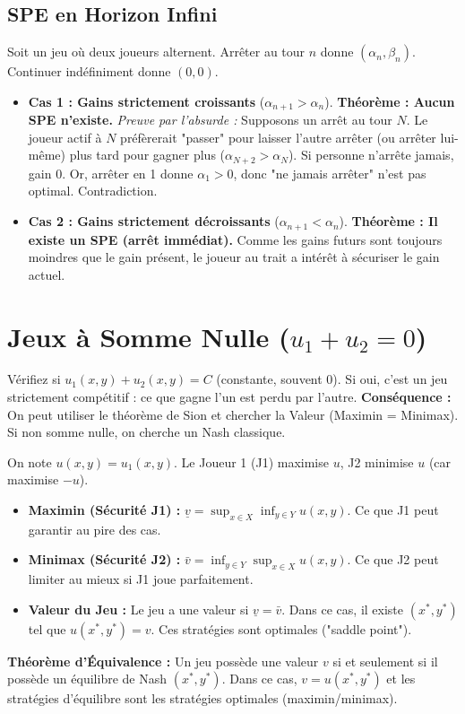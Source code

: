 \documentclass[10pt,a4paper]{article}
\begin{document}
\subsection{SPE en Horizon Infini}
Soit un jeu où deux joueurs alternent. Arrêter au tour $n$ donne $(\alpha_n, \beta_n)$. Continuer indéfiniment donne $(0,0)$.
\begin{itemize}
    \item \textbf{Cas 1 : Gains strictement croissants} ($\alpha_{n+1} > \alpha_n$).
    \textbf{Théorème : Aucun SPE n'existe.}
    \textit{Preuve par l'absurde :}
    Supposons un arrêt au tour $N$. Le joueur actif à $N$ préfèrerait "passer" pour laisser l'autre arrêter (ou arrêter lui-même) plus tard pour gagner plus ($\alpha_{N+2} > \alpha_N$).
    Si personne n'arrête jamais, gain 0. Or, arrêter en 1 donne $\alpha_1 > 0$, donc "ne jamais arrêter" n'est pas optimal. Contradiction.

    \item \textbf{Cas 2 : Gains strictement décroissants} ($\alpha_{n+1} < \alpha_n$).
    \textbf{Théorème : Il existe un SPE (arrêt immédiat).}
    Comme les gains futurs sont toujours moindres que le gain présent, le joueur au trait a intérêt à sécuriser le gain actuel.
\end{itemize}

\section{Jeux à Somme Nulle ($u_1 + u_2 = 0$)}
\begin{tcolorbox}[colback=green!5,title=Astuce : Repérer un Jeu à Somme Nulle]
Vérifiez si $u_1(x,y) + u_2(x,y) = C$ (constante, souvent 0).
Si oui, c'est un jeu strictement compétitif : ce que gagne l'un est perdu par l'autre.
\textbf{Conséquence :} On peut utiliser le théorème de Sion et chercher la Valeur (Maximin = Minimax). Si non somme nulle, on cherche un Nash classique.
\end{tcolorbox}
On note $u(x,y) = u_1(x,y)$. Le Joueur 1 (J1) maximise $u$, J2 minimise $u$ (car maximise $-u$).
\begin{itemize}
    \item \textbf{Maximin (Sécurité J1) :} $\underline{v} = \sup_{x \in X} \inf_{y \in Y} u(x,y)$.
    Ce que J1 peut garantir au pire des cas.
    \item \textbf{Minimax (Sécurité J2) :} $\bar{v} = \inf_{y \in Y} \sup_{x \in X} u(x,y)$.
    Ce que J2 peut limiter au mieux si J1 joue parfaitement.
    \item \textbf{Valeur du Jeu :} Le jeu a une valeur si $\underline{v} = \bar{v}$. Dans ce cas, il existe $(x^*, y^*)$ tel que $u(x^*, y^*) = v$. Ces stratégies sont optimales ("saddle point").
\end{itemize}
\textbf{Théorème d'Équivalence :} Un jeu possède une valeur $v$ si et seulement si il possède un équilibre de Nash $(x^*, y^*)$. Dans ce cas, $v = u(x^*, y^*)$ et les stratégies d'équilibre sont les stratégies optimales (maximin/minimax).
\end{document}
